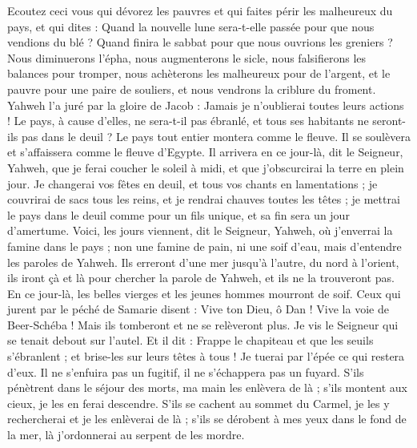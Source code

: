 \begin{multicols}{2}
Ecoutez ceci vous qui dévorez les pauvres et qui faites périr les malheureux du pays,
et qui dites : Quand la nouvelle lune sera-t-elle passée pour que nous vendions du blé ? Quand finira le sabbat pour que nous ouvrions les greniers ? Nous diminuerons l’épha, nous augmenterons le sicle, nous falsifierons les balances pour tromper,
nous achèterons les malheureux pour de l’argent, et le pauvre pour une paire de souliers, et nous vendrons la criblure du froment.
Yahweh l’a juré par la gloire de Jacob : Jamais je n’oublierai toutes leurs actions !
Le pays, à cause d’elles, ne sera-t-il pas ébranlé, et tous ses habitants ne seront-ils pas dans le deuil ? Le pays tout entier montera comme le fleuve. Il se soulèvera et s’affaissera comme le fleuve d'Egypte.
Il arrivera en ce jour-là, dit le Seigneur, Yahweh, que je ferai coucher le soleil à midi, et que j’obscurcirai la terre en plein jour.
Je changerai vos fêtes en deuil, et tous vos chants en lamentations ; je couvrirai de sacs tous les reins, et je rendrai chauves toutes les têtes ; je mettrai le pays dans le deuil comme pour un fils unique, et sa fin sera un jour d’amertume.
Voici, les jours viennent, dit le Seigneur, Yahweh, où j'enverrai la famine dans le pays ; non une famine de pain, ni une soif d'eau, mais d’entendre les paroles de Yahweh.
Ils erreront d’une mer jusqu'à l'autre, du nord à l'orient, ils iront çà et là pour chercher la parole de Yahweh, et ils ne la trouveront pas.
En ce jour-là, les belles vierges et les jeunes hommes mourront de soif.
Ceux qui jurent par le péché de Samarie disent : Vive ton Dieu, ô Dan ! Vive la voie de Beer-Schéba ! Mais ils tomberont et ne se relèveront plus.
\VerseOne{}Je vis le Seigneur qui se tenait debout sur l'autel. Et il dit : Frappe le chapiteau et que les seuils s’ébranlent ; et brise-les sur leurs têtes à tous ! Je tuerai par l'épée ce qui restera d'eux. Il ne s’enfuira pas un fugitif, il ne s’échappera pas un fuyard.
S’ils pénètrent dans le séjour des morts, ma main les enlèvera de là ; s’ils montent aux cieux, je les en ferai descendre.
S’ils se cachent au sommet du Carmel, je les y rechercherai et je les enlèverai de là ; s’ils se dérobent à mes yeux dans le fond de la mer, là j’ordonnerai au serpent de les mordre.

\end{multicols}
